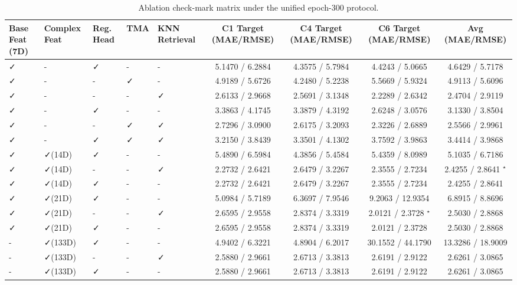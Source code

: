 \begin{table}[t]
\centering
\caption{Ablation check-mark matrix under the unified epoch-300 protocol.}
\label{tab:ablation_checkmark_matrix_epoch300}
\begin{tabular}{lllllcccc}
\toprule
Base Feat (7D) & Complex Feat & Reg. Head & TMA & KNN Retrieval & C1 Target (MAE/RMSE) & C4 Target (MAE/RMSE) & C6 Target (MAE/RMSE) & Avg (MAE/RMSE) \\
\midrule
✓ & - & ✓ & - & - & 5.1470 / 6.2884 & 4.3575 / 5.7984 & 4.4243 / 5.0665 & 4.6429 / 5.7178 \\
✓ & - & - & ✓ & - & 4.9189 / 5.6726 & 4.2480 / 5.2238 & 5.5669 / 5.9324 & 4.9113 / 5.6096 \\
✓ & - & - & - & ✓ & 2.6133 / 2.9668 & 2.5691 / 3.1348 & 2.2289 / 2.6342 & 2.4704 / 2.9119 \\
✓ & - & ✓ & - & - & 3.3863 / 4.1745 & 3.3879 / 4.3192 & 2.6248 / 3.0576 & 3.1330 / 3.8504 \\
✓ & - & - & ✓ & ✓ & 2.7296 / 3.0900 & 2.6175 / 3.2093 & 2.3226 / 2.6889 & 2.5566 / 2.9961 \\
✓ & - & ✓ & ✓ & ✓ & 3.2150 / 3.8439 & 3.3501 / 4.1302 & 3.7592 / 3.9863 & 3.4414 / 3.9868 \\
✓ & ✓(14D) & ✓ & - & - & 5.4890 / 6.5984 & 4.3856 / 5.4584 & 5.4359 / 8.0989 & 5.1035 / 6.7186 \\
✓ & ✓(14D) & - & - & ✓ & 2.2732 / 2.6421 & 2.6479 / 3.2267 & 2.3555 / 2.7234 & 2.4255 / 2.8641 $^{\star}$ \\
✓ & ✓(14D) & ✓ & - & - & 2.2732 / 2.6421 & 2.6479 / 3.2267 & 2.3555 / 2.7234 & 2.4255 / 2.8641 \\
✓ & ✓(21D) & ✓ & - & - & 5.0984 / 5.7189 & 6.3697 / 7.9546 & 9.2063 / 12.9354 & 6.8915 / 8.8696 \\
✓ & ✓(21D) & - & - & ✓ & 2.6595 / 2.9558 & 2.8374 / 3.3319 & 2.0121 / 2.3728 $^{\star}$ & 2.5030 / 2.8868 \\
✓ & ✓(21D) & ✓ & - & - & 2.6595 / 2.9558 & 2.8374 / 3.3319 & 2.0121 / 2.3728 & 2.5030 / 2.8868 \\
- & ✓(133D) & ✓ & - & - & 4.9402 / 6.3221 & 4.8904 / 6.2017 & 30.1552 / 44.1790 & 13.3286 / 18.9009 \\
- & ✓(133D) & - & - & ✓ & 2.5880 / 2.9661 & 2.6713 / 3.3813 & 2.6191 / 2.9122 & 2.6261 / 3.0865 \\
- & ✓(133D) & ✓ & - & - & 2.5880 / 2.9661 & 2.6713 / 3.3813 & 2.6191 / 2.9122 & 2.6261 / 3.0865 \\
\bottomrule
\end{tabular}
\end{table}
